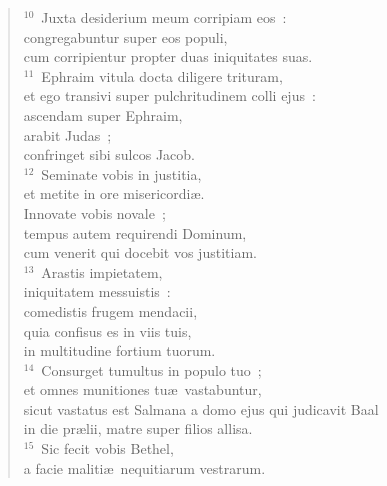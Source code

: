 \begin{flushleft}
\begin{verse}
${}^{10}$~Juxta desiderium meum corripiam eos~:\\ congregabuntur super eos populi,\\ cum corripientur propter duas iniquitates suas.\\
${}^{11}$~Ephraim vitula docta diligere trituram,\\ et ego transivi super pulchritudinem colli ejus~:\\ ascendam super Ephraim,\\ arabit Judas~;\\ confringet sibi sulcos Jacob.\\
${}^{12}$~Seminate vobis in justitia,\\ et metite in ore misericordi\ae .\\ Innovate vobis novale~;\\ tempus autem requirendi Dominum,\\ cum venerit qui docebit vos justitiam.\\
${}^{13}$~Arastis impietatem,\\ iniquitatem messuistis~:\\ comedistis frugem mendacii,\\ quia confisus es in viis tuis,\\ in multitudine fortium tuorum.\\
${}^{14}$~Consurget tumultus in populo tuo~;\\ et omnes munitiones tu\ae\ vastabuntur,\\ sicut vastatus est Salmana a domo ejus qui judicavit Baal\\ in die pr\ae lii, matre super filios allisa.\\
${}^{15}$~Sic fecit vobis Bethel,\\ a facie maliti\ae\ nequitiarum vestrarum.\end{verse}\end{flushleft}


